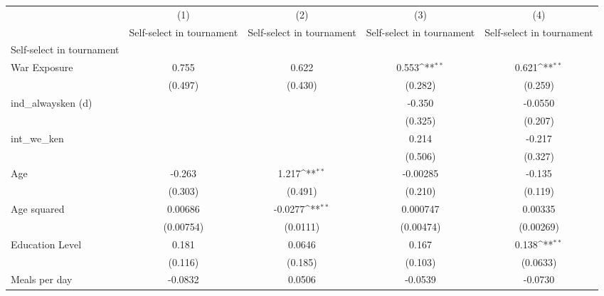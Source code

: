 {
\def\sym#1{\ifmmode^{#1}\else\(^{#1}\)\fi}
\begin{tabular}{l*{4}{c}}
\hline\hline
                    &\multicolumn{1}{c}{(1)}&\multicolumn{1}{c}{(2)}&\multicolumn{1}{c}{(3)}&\multicolumn{1}{c}{(4)}\\
                    &\multicolumn{1}{c}{Self-select in tournament}&\multicolumn{1}{c}{Self-select in tournament}&\multicolumn{1}{c}{Self-select in tournament}&\multicolumn{1}{c}{Self-select in tournament}\\
\hline
Self-select in tournament&                     &                     &                     &                     \\
War Exposure        &       0.755         &       0.622         &       0.553\sym{**} &       0.621\sym{**} \\
                    &     (0.497)         &     (0.430)         &     (0.282)         &     (0.259)         \\
[1em]
ind\_alwaysken (d)   &                     &                     &      -0.350         &     -0.0550         \\
                    &                     &                     &     (0.325)         &     (0.207)         \\
[1em]
int\_we\_ken          &                     &                     &       0.214         &      -0.217         \\
                    &                     &                     &     (0.506)         &     (0.327)         \\
[1em]
Age                 &      -0.263         &       1.217\sym{**} &    -0.00285         &      -0.135         \\
                    &     (0.303)         &     (0.491)         &     (0.210)         &     (0.119)         \\
[1em]
Age squared         &     0.00686         &     -0.0277\sym{**} &    0.000747         &     0.00335         \\
                    &   (0.00754)         &    (0.0111)         &   (0.00474)         &   (0.00269)         \\
[1em]
Education Level     &       0.181         &      0.0646         &       0.167         &       0.138\sym{**} \\
                    &     (0.116)         &     (0.185)         &     (0.103)         &    (0.0633)         \\
[1em]
Meals per day       &     -0.0832         &      0.0506         &     -0.0539         &     -0.0730         \\

\end{tabular}}
